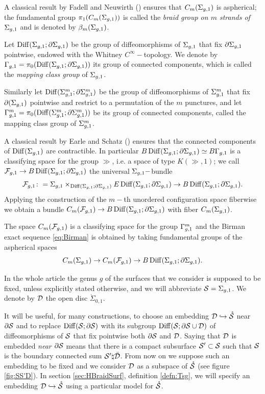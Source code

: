 A classical result by Fadell and Neuwirth (\cite{FadellNeuwirth}) ensures
that $C_m(\sg)$ is aspherical; the fundamental group $\pi_1(C_m(\sg))$ is
called the \emph{braid group on $m$ strands of $\sg$} and is denoted by $\bms$.

\begin{defn}
 \label{def:mcg}
 Let $\Diff(\sg;\partial\sg)$ be the group of diffeomorphisms of $\sg$ that fix $\partial\sg$ pointwise,
 endowed with the Whitney $C^{\infty}-$topology. We denote by $\gg=\pi_0(\Diff(\sg;\partial\sg))$ its group of connected
 components, which is called the \emph{mapping class group} of $\sg$.
 
 Similarly let $\Diff(\sgm;\partial\sgm)$ be the group of diffeomorphisms of $\sgm$ that fix $\partial(\sg)$
 pointwise and restrict to a permutation of the $m$ punctures, and let $\ggm=\pi_0(\Diff(\sgm;\partial\sgm))$ be its
 group of connected components, called the mapping class group of $\sgm$.
 \end{defn}
 A classical result by Earle and Schatz (\cite{EarleSchatz}) ensures that the connected components
 of $\Diff(\sg)$ are contractible. In particular $B\Diff(\sg;\partial\sg)\simeq B\gg$ is
 a classifying space for
 the group $\gg$, i.e. a space of type $K(\gg,1)$; we call $\cF_{g,1}\to B\Diff(\sg;\partial\sg)$ the universal
 $\sg-$bundle
 \[
  \cF_{g,1}\colon=\sg\times_{\Diff(\sg;\partial\sg)}E\Diff(\sg;\partial\sg)\to B\Diff(\sg;\partial\sg).
 \]
Applying the construction of the $m-$th unordered configuration space fiberwise we obtain a bundle
$C_m(\cF_{g,1})\to B\Diff(\sg;\partial\sg)$ with fiber $C_m(\sg)$.

The space $C_m(\cF_{g,1})$ is a classifying space for the
group $\ggm$ and the Birman exact sequence \ref{eq:Birman} is obtained by taking fundamental
groups of the aspherical spaces
\begin{equation}\label{eq:Birmanbundle}
C_m(\sg)\to C_m(\cF_{g,1})\to B\Diff(\sg;\partial\sg).
\end{equation}

In the whole article the genus $g$ of the surfaces that we consider is supposed to be fixed,
unless explicitly stated otherwise, and we will abbreviate $\S=\sg$.
We denote by $\D$ the open disc $\mathring{\Sigma}_{0,1}$.

It will be useful, for many constructions, to choose an embedding
$\D\hookrightarrow\mrS$ near $\partial\S$ and to replace
$\Diff(\S;\partial\S)$ with its subgroup $\Diff(\S;\partial\S\cup\D)$ of diffeomorphisms
of $\S$ that fix pointwise both $\partial\S$ and $\D$. Saying that $\D$ is embedded
\emph{near $\partial\S$} means that there is a compact subsurface $\S'\subset\S$
such that $\S$ is the boundary connected sum $\S'\natural\bar\D$.
From now on we suppose such an embedding to be fixed and we consider $\D$ as a subspace
of $\mrS$ (see figure \ref{fig:SS'D}). In section \ref{sec:HBraidSurf}, definition \ref{defn:Tsg},
we will specify an embedding $\D\hookrightarrow\mrS$ using a particular model for $\mrS$.

